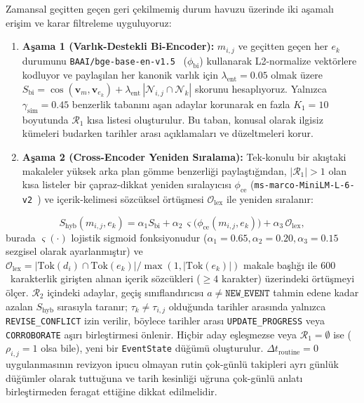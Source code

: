 ﻿\documentclass[journal]{IEEEtran}
\begin{document}
Zamansal ge\c{c}itten ge\c{c}en geri \c{c}ekilmemi\c{s} durum havuzu \"{u}zerinde iki a\c{s}amal{\i} eri\c{s}im ve karar filtreleme uyguluyoruz:
\begin{enumerate}
    \item \textbf{A\c{s}ama 1 (Varl{\i}k-Destekli Bi-Encoder):} $m_{i,j}$ ve ge\c{c}itten ge\c{c}en her $e_k$ durumunu \texttt{BAAI/bge-base-en-v1.5}~\cite{xiao2024cpack} ($\phi_{\text{bi}}$) kullanarak L2-normalize vekt\"{o}rlere kodluyor ve payla\c{s}{\i}lan her kanonik varl{\i}k i\c{c}in $\lambda_{\text{ent}} = 0.05$ olmak \"{u}zere $S_{\text{bi}} = \cos(\mathbf{v}_{m}, \mathbf{v}_{e_k}) + \lambda_{\text{ent}}\, |\mathcal{N}_{i,j} \cap \mathcal{N}_k|$ skorunu hesapl{\i}yoruz. Yaln{\i}zca $\gamma_{\text{sim}} = 0.45$ benzerlik taban{\i}n{\i} a\c{s}an adaylar korunarak en fazla $K_1 = 10$ boyutunda $\mathcal{R}_1$ k{\i}sa listesi olu\c{s}turulur. Bu taban, konusal olarak ilgisiz k\"{u}meleri budarken tarihler aras{\i} a\c{c}{\i}klamalar{\i} ve d\"{u}zeltmeleri korur.
    \item \textbf{A\c{s}ama 2 (Cross-Encoder Yeniden S{\i}ralama):} Tek-konulu bir ak{\i}\c{s}taki makaleler y\"{u}ksek arka plan g\"{o}mme benzerli\u{g}i payla\c{s}t{\i}\u{g}{\i}ndan, $|\mathcal{R}_1| > 1$ olan k{\i}sa listeler bir \c{c}apraz-dikkat yeniden s{\i}ralay{\i}c{\i}s{\i} $\phi_{\text{ce}}$ (\texttt{ms-marco-MiniLM-L-6-v2}~\cite{wang2020minilm, nguyen2016msmarco}) ve i\c{c}erik-kelimesi s\"{o}zc\"{u}ksel \"{o}rt\"{u}\c{s}mesi $\mathcal{O}_{\text{lex}}$ ile yeniden s{\i}ralan{\i}r:
\end{enumerate}
\begin{equation}
S_{\text{hyb}}(m_{i,j}, e_k) = \alpha_1 S_{\text{bi}} + \alpha_2\,\varsigma\big(\phi_{\text{ce}}(m_{i,j}, e_k)\big) + \alpha_3\,\mathcal{O}_{\text{lex}},
\label{eq:hybrid_rerank}
\end{equation}
burada $\varsigma(\cdot)$ lojistik sigmoid fonksiyonudur ($\alpha_1=0.65, \alpha_2=0.20, \alpha_3=0.15$ sezgisel olarak ayarlanm{\i}\c{s}t{\i}r) ve $\mathcal{O}_{\text{lex}} = |\text{Tok}(d_i)\cap\text{Tok}(e_k)| / \max(1, |\text{Tok}(e_k)|)$ makale ba\c{s}l{\i}\u{g}{\i} ile $600$~karakterlik giri\c{s}ten al{\i}nan i\c{c}erik s\"{o}zc\"{u}kleri ($\ge 4$ karakter) \"{u}zerindeki \"{o}rt\"{u}\c{s}meyi \"{o}l\c{c}er. $\mathcal{R}_2$ i\c{c}indeki adaylar, ge\c{c}i\c{s} s{\i}n{\i}fland{\i}r{\i}c{\i}s{\i} $a \neq \texttt{NEW\_EVENT}$ tahmin edene kadar azalan $S_{\text{hyb}}$ s{\i}ras{\i}yla taran{\i}r; $\tau_k \neq \tau_{i,j}$ oldu\u{g}unda tarihler aras{\i}nda yaln{\i}zca \texttt{REVISE\_CONFLICT} izin verilir, b\"{o}ylece tarihler aras{\i} \texttt{UPDATE\_PROGRESS} veya \texttt{CORROBORATE} a\c{s}{\i}r{\i} birle\c{s}tirmesi \"{o}nlenir. Hi\c{c}bir aday e\c{s}le\c{s}mezse veya $\mathcal{R}_1 = \emptyset$ ise ($\rho_{i,j}=1$ olsa bile), yeni bir \texttt{EventState} d\"{u}\u{g}\"{u}m\"{u} olu\c{s}turulur. $\Delta t_{\text{routine}}=0$ uygulanmas{\i}n{\i}n revizyon ipucu olmayan rutin \c{c}ok-g\"{u}nl\"{u} takipleri ayr{\i} g\"{u}nl\"{u}k d\"{u}\u{g}\"{u}mler olarak tuttu\u{g}una ve tarih kesinli\u{g}i u\u{g}runa \c{c}ok-g\"{u}nl\"{u} anlat{\i} birle\c{s}tirmeden feragat etti\u{g}ine dikkat edilmelidir.
\end{document}
